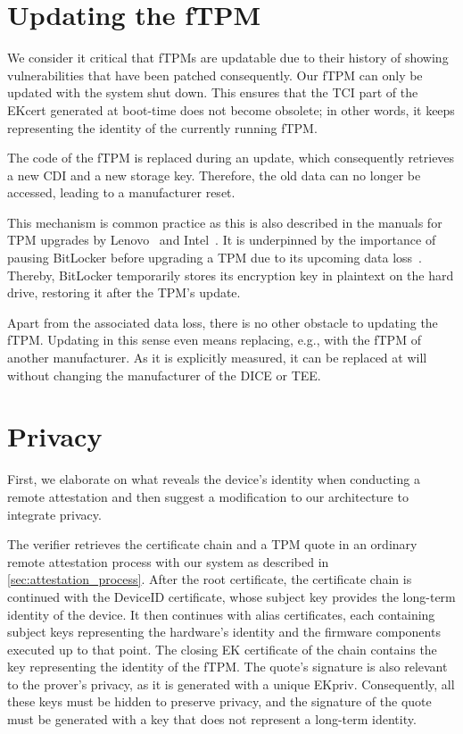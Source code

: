 \section{Updating the fTPM}

We consider it critical that \acp{fTPM} are updatable due to their history of showing vulnerabilities that have been patched consequently.
Our \ac{fTPM} can only be updated with the system shut down.
This ensures that the TCI part of the EKcert generated at boot-time does not become obsolete; in other words, it keeps representing the identity of the currently running fTPM\@.

The code of the fTPM is replaced during an update, which consequently retrieves a new CDI and a new storage key.
Therefore, the old data can no longer be accessed, leading to a manufacturer reset.

This mechanism is common practice as this is also described in the manuals for TPM upgrades by Lenovo~\cite{LenovoTpmUpgrade} and Intel~\cite{intelTpmUpgrade}. 
It is underpinned by the importance of pausing BitLocker before upgrading a TPM due to its upcoming data loss~\cite{BitlockerTpmUpgrade}.
Thereby, BitLocker temporarily stores its encryption key in plaintext on the hard drive, restoring it after the TPM's update.

Apart from the associated data loss, there is no other obstacle to updating the \ac{fTPM}\@.
Updating in this sense even means replacing, e.g., with the fTPM of another manufacturer.
As it is explicitly measured, it can be replaced at will without changing the manufacturer of the \ac{DICE} or \ac{TEE}\@.

\section{Privacy}\label{sec:privacy}

First, we elaborate on what reveals the device's identity when conducting a remote attestation and then suggest a modification to our architecture to integrate privacy.

The verifier retrieves the certificate chain and a TPM quote in an ordinary remote attestation process with our system as described in \autoref{sec:attestation_process}.
After the root certificate, the certificate chain is continued with the DeviceID certificate, whose subject key provides the long-term identity of the device.
It then continues with alias certificates, each containing subject keys representing the hardware's identity and the firmware components executed up to that point.
The closing EK certificate of the chain contains the key representing the identity of the fTPM\@.
The quote's signature is also relevant to the prover's privacy, as it is generated with a unique EKpriv.
Consequently, all these keys must be hidden to preserve privacy, and the signature of the quote must be generated with a key that does not represent a long-term identity.

